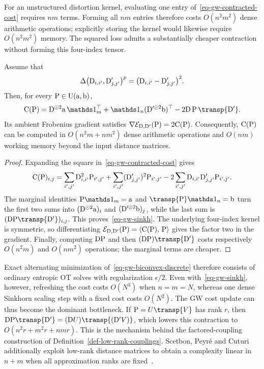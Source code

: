 For an unstructured distortion kernel, evaluating one entry of~\eqref{eq-gw-contracted-cost} requires $nm$ terms. Forming all $nm$ entries therefore costs $O(n^2m^2)$ dense arithmetic operations; explicitly storing the kernel would likewise require $O(n^2m^2)$ memory. The squared loss admits a substantially cheaper contraction without forming this four-index tensor.

\begin{prop}\label{prop-gw-squared-cost-update}
	Assume that
	\[
		\Delta\bigl(\mathrm{D}_{i,i'},\mathrm{D}'_{j,j'}\bigr)^p
		=
		\bigl(\mathrm{D}_{i,i'}-\mathrm{D}'_{j,j'}\bigr)^2.
	\]
	Then, for every $\mathrm{P}\in\mathrm{U}(\mathrm{a},\mathrm{b})$,
	\begin{equation}\label{eq-gw-sinkh}
		\C(\P)
		=
		\distD^{\odot2}\a\,\ones_m^\top
		+
		\ones_n(\distD'^{\odot2}\b)^\top
		-
		2\distD\,\P\,\transp{\distD'}.
	\end{equation}
	Its ambient Frobenius gradient satisfies
	$\nabla\mathcal{E}_{\mathrm{D},\mathrm{D}'}(\mathrm{P})=2\mathrm{C}(\mathrm{P})$.
	Consequently, $\mathrm{C}(\mathrm{P})$ can be computed in $O(n^2m+nm^2)$ dense arithmetic operations and $O(nm)$ working memory beyond the input distance matrices.
\end{prop}
\begin{proof}
	Expanding the square in~\eqref{eq-gw-contracted-cost} gives
	\[
		\mathrm{C}(\mathrm{P})_{i,j}
		=
		\sum_{i',j'}\mathrm{D}_{i,i'}^2\mathrm{P}_{i',j'}
		+
		\sum_{i',j'}(\mathrm{D}'_{j,j'})^2\mathrm{P}_{i',j'}
		-
		2\sum_{i',j'}\mathrm{D}_{i,i'}\mathrm{D}'_{j,j'}\mathrm{P}_{i',j'}.
	\]
	The marginal identities $\P\ones_m=\a$ and $\transp{\P}\ones_n=\b$ turn the first two sums into $(\mathrm{D}^{\odot2}\mathrm{a})_i$ and $(\mathrm{D}'^{\odot2}\mathrm{b})_j$, while the last sum is $(\distD\P\transp{\distD'})_{i,j}$. This proves~\eqref{eq-gw-sinkh}. The underlying four-index kernel is symmetric, so differentiating
	$\mathcal{E}_{\mathrm{D},\mathrm{D}'}(\mathrm{P})=\langle \mathrm{C}(\mathrm{P}),\,\mathrm{P}\rangle$
	gives the factor two in the gradient. Finally, computing $\mathrm{D}\mathrm{P}$ and then $(\distD\P)\transp{\distD'}$ costs respectively $O(n^2m)$ and $O(nm^2)$ operations; the marginal terms are cheaper.
\end{proof}

Exact alternating minimization of~\eqref{eq-gw-biconvex-discrete} therefore consists of ordinary entropic OT solves with regularization $\epsilon/2$. Even with~\eqref{eq-gw-sinkh}, however, refreshing the cost costs $O(N^3)$ when $n=m=N$, whereas one dense Sinkhorn scaling step with a fixed cost costs $O(N^2)$. The GW cost update can thus become the dominant bottleneck. If $\P=U\transp{V}$ has rank $r$, then
$\distD\P\transp{\distD'}=(\distD U)\transp{(\distD'V)}$,
which lowers this contraction to $O(n^2r+m^2r+nmr)$. This is the mechanism behind the factored-coupling construction of Definition~\ref{def-low-rank-couplings}. Scetbon, Peyr\'e and Cuturi additionally exploit low-rank distance matrices to obtain a complexity linear in $n+m$ when all approximation ranks are fixed~\cite{ScetbonPeyreCuturi2022LinearTimeGW}.

